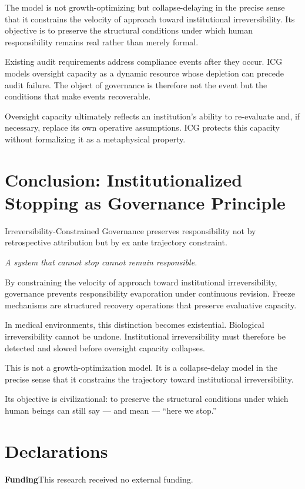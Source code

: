 \documentclass[12pt]{article}
\begin{document}
The model is not growth-optimizing but collapse-delaying in the precise sense that it
constrains the velocity of approach toward institutional irreversibility. Its objective
is to preserve the structural conditions under which human responsibility remains real
rather than merely formal.

Existing audit requirements address compliance events after they occur. ICG models oversight
capacity as a dynamic resource whose depletion can precede audit failure. The object of
governance is therefore not the event but the conditions that make events recoverable.

Oversight capacity ultimately reflects an institution's ability to re-evaluate and, if
necessary, replace its own operative assumptions. ICG protects this capacity without
formalizing it as a metaphysical property.

\section{Conclusion: Institutionalized Stopping as Governance Principle}

Irreversibility-Constrained Governance preserves responsibility not by retrospective
attribution but by ex ante trajectory constraint.

\textit{A system that cannot stop cannot remain responsible.}

By constraining the velocity of approach toward institutional irreversibility, governance
prevents responsibility evaporation under continuous revision. Freeze mechanisms are
structured recovery operations that preserve evaluative capacity.

In medical environments, this distinction becomes existential. Biological irreversibility
cannot be undone. Institutional irreversibility must therefore be detected and slowed
before oversight capacity collapses.

This is not a growth-optimization model. It is a collapse-delay model in the precise
sense that it constrains the trajectory toward institutional irreversibility.

Its objective is civilizational: to preserve the structural conditions under which
human beings can still say --- and mean --- ``here we stop.''

\section*{Declarations}

\noindent\textbf{Funding}\quad This research received no external funding.
\end{document}
